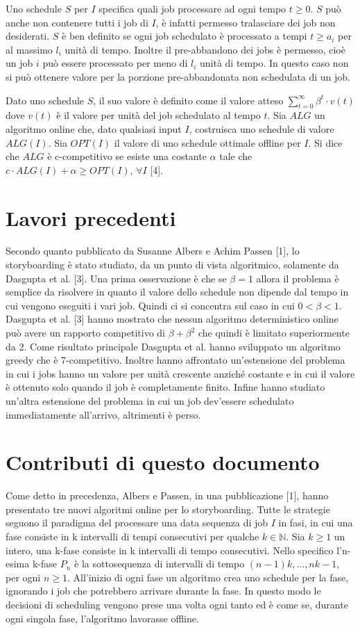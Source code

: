 \documentclass[12pt]{article}
\newcommand*{\N}{\mathbb{N}}
\begin{document}
Uno schedule $S$ per $I$ specifica quali job processare ad ogni tempo $t \geq 0$. $S$ può anche non contenere tutti i job di $I$, è infatti permesso tralasciare dei job non desiderati. $S$ è ben definito se ogni job schedulato è processato a tempi $t \geq a_{i}$ per al massimo $l_{i}$ unità di tempo. Inoltre il pre-abbandono dei jobs è permesso, cioè un job $i$ può essere processato per meno di $l_{i}$ unità di tempo. In questo caso non si può ottenere valore per la porzione pre-abbandonata non schedulata di un job. 

Dato uno schedule $S$, il suo valore è definito come il valore atteso $\sum_{t=0}^{\infty} \beta^{t}\cdot v(t)$ dove $v(t)$ è il valore per unità del job schedulato al tempo $t$. Sia $ALG$ un algoritmo online che, dato qualsiasi input $I$, costruisca uno schedule di valore $ALG(I)$. Sia $OPT(I)$ il valore di uno schedule ottimale offline per $I$. Si dice che $ALG$ è c-competitivo se esiste una costante $\alpha$ tale che $c \cdot ALG(I) + \alpha \geq OPT(I)$, $\forall I$ [4].

\section{Lavori precedenti}
Secondo quanto pubblicato da Susanne Albers e Achim Passen [1], lo storyboarding è stato studiato, da un punto di vista algoritmico, solamente da Dasgupta et al. [3]. Una prima osservazione è che se $\beta  = 1$ allora il problema è semplice da risolvere in quanto il valore dello schedule non dipende dal tempo in cui vengono eseguiti i vari job. Quindi ci si concentra sul caso in cui $0 < \beta < 1$.
Dasgupta et al. [3] hanno mostrato che nessun algoritmo deterministico online può avere un rapporto competitivo di $\beta + \beta^{2}$ che quindi è limitato superiormente da 2. Come risultato principale Dasgupta et al. hanno sviluppato un algoritmo greedy che è 7-competitivo. Inoltre hanno affrontato un’estensione del problema in cui i jobs hanno un valore per unità crescente anziché costante e in cui il valore è ottenuto solo quando il job è completamente finito. Infine hanno studiato un’altra estensione del problema in cui un job dev’essere schedulato immediatamente all’arrivo, altrimenti è perso.

\section{Contributi di questo documento}
Come detto in precedenza, Albers e Passen, in una pubblicazione [1], hanno presentato tre nuovi algoritmi online per lo storyboarding. Tutte le strategie seguono il paradigma del processare una data sequenza di job $I$ in fasi, in cui una fase consiste in k intervalli di tempi consecutivi per qualche $k\in \N$. 
Sia $k \geq 1$ un intero, una k-fase consiste in k intervalli di tempo consecutivi. Nello specifico l’n-esima k-fase $P_{n}$ è la sottosequenza di intervalli di tempo $(n-1)k,…,nk - 1$, per ogni $n \geq 1$. All’inizio di ogni fase un algoritmo crea uno schedule per la fase, ignorando i job che potrebbero arrivare durante la fase. In questo modo le decisioni di scheduling vengono prese una volta ogni tanto ed è come se, durante ogni singola fase, l'algoritmo lavorasse offline.
\end{document}
